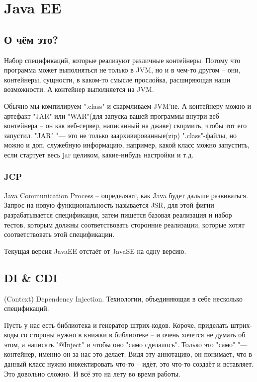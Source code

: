 \chapter{Java EE}
\section{О чём это?}
Набор спецификаций, которые реализуют различные контейнеры.
Потому что программа может выполняться не только в JVM, но и в чем-то другом --
они, контейнеры, сущности, в каком-то смысле прослойка, расширяющая наши возможности. 
А контейнер выполняется на JVM. 

Обычно мы компилируем \java".class" и скармливаем JVM'не.
А контейнеру можно и артефакт \java"JAR" или \java"WAR"(для запуска вашей программы внутри веб-контейнера -- 
он как веб-сервер, написанный на джаве) скормить, чтобы тот его запустил.
\java"JAR" "--- это не только заархивированные(zip) 
\java".class"-файлы, но можно и доп. служебную информацию, например, какой класс можно запустить, если стартует весь jar целиком, 
какие-нибудь настройки и т.д.

\subsection{JCP}
Java Communication Process -- определяют, как Java будет дальше развиваться.
Запрос на новую функциональность называется JSR, для этой фигни разрабатывается спецификация,
затем пишется базовая реализация и набор тестов, которым должны соответствовать сторонние реализации,
которые хотят соответствовать этой спецификации.

Текущая версия JavaEE отстаёт от JavaSE на одну версию.

\section{DI \& CDI}
(Context) Dependency Injection.
Технологии, объединяющая в себе несколько спецификаций.

Пусть у нас есть библиотека и генератор штрих-кодов. 
Короче, приделать штрих-коды со стороны нужно в книжки в библиотеке -- 
и очень хочется не думать об этом, а написать \java"@Inject" и чтобы оно "само сделалось".
Только это "само" "--- контейнер, именно он за нас это делает.
Видя эту аннотацию, он понимает, что в данный класс нужно инжектировать что-то -- идёт, 
это что-то создаёт и вставляет. Это довольно сложно. И всё это на лету во время работы.

